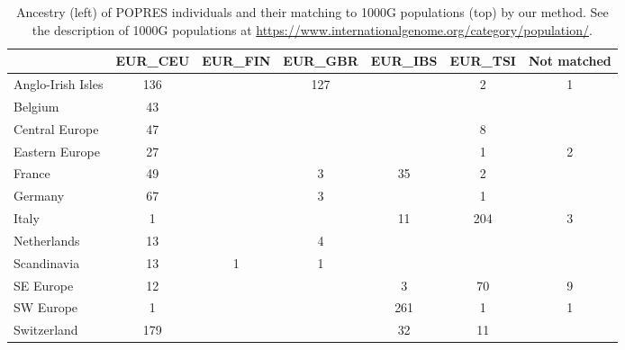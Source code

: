 \begin{table}[ht]
\centering
\caption{Ancestry (left) of POPRES individuals and their matching to 1000G populations (top) by our method. See the description of 1000G populations at \url{https://www.internationalgenome.org/category/population/}.}
\label{tab:ancestry-pred-popres}
\begin{tabular}{|l|c|c|c|c|c|c|}
  \hline
 & EUR\_CEU & EUR\_FIN & EUR\_GBR & EUR\_IBS & EUR\_TSI & Not matched \\
  \hline
Anglo-Irish Isles & 136 &  & 127 &  & 2 & 1 \\
  Belgium & 43 &  &  &  &  &  \\
  Central Europe & 47 &  &  &  & 8 &  \\
  Eastern Europe & 27 &  &  &  & 1 & 2 \\
  France & 49 &  & 3 & 35 & 2 &  \\
  Germany & 67 &  & 3 &  & 1 &  \\
  Italy & 1 &  &  & 11 & 204 & 3 \\
  Netherlands & 13 &  & 4 &  &  &  \\
  Scandinavia & 13 & 1 & 1 &  &  &  \\
  SE Europe & 12 &  &  & 3 & 70 & 9 \\
  SW Europe & 1 &  &  & 261 & 1 & 1 \\
  Switzerland & 179 &  &  & 32 & 11 &  \\
   \hline
\end{tabular}
\end{table}
